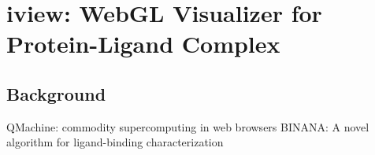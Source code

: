 \chapter{iview: WebGL Visualizer for Protein-Ligand Complex}

\section{Background}

\citep{1405} QMachine: commodity supercomputing in web browsers
\citep{1413} BINANA: A novel algorithm for ligand-binding characterization

\chapterend
